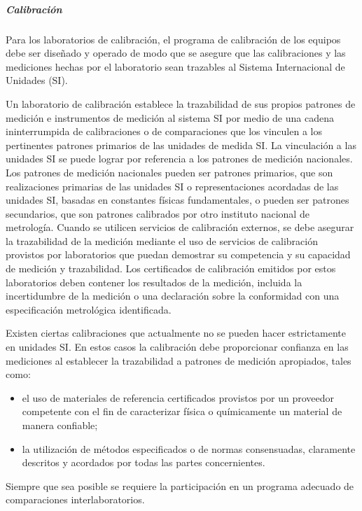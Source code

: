 \subparagraph{Calibración}
\par 
Para los laboratorios de calibración, el programa de calibración de los equipos debe ser diseñado
y operado de modo que se asegure que las calibraciones y las mediciones hechas por el laboratorio sean
trazables al Sistema Internacional de Unidades (SI).
\par \noindent
Un laboratorio de calibración establece la trazabilidad de sus propios patrones de medición e instrumentos de
medición al sistema SI por medio de una cadena ininterrumpida de calibraciones o de comparaciones que los
vinculen a los pertinentes patrones primarios de las unidades de medida SI. La vinculación a las unidades SI se
puede lograr por referencia a los patrones de medición nacionales. Los patrones de medición nacionales
pueden ser patrones primarios, que son realizaciones primarias de las unidades SI o representaciones
acordadas de las unidades SI, basadas en constantes físicas fundamentales, o pueden ser patrones
secundarios, que son patrones calibrados por otro instituto nacional de metrología. Cuando se utilicen servicios
de calibración externos, se debe asegurar la trazabilidad de la medición mediante el uso de servicios de
calibración provistos por laboratorios que puedan demostrar su competencia y su capacidad de medición y
trazabilidad. Los certificados de calibración emitidos por estos laboratorios deben contener los resultados de la
medición, incluida la incertidumbre de la medición o una declaración sobre la conformidad con una
especificación metrológica identificada.

\par \noindent
Existen ciertas calibraciones que actualmente no se pueden hacer estrictamente en unidades SI.
En estos casos la calibración debe proporcionar confianza en las mediciones al establecer la trazabilidad a
patrones de medición apropiados, tales como:

\begin{itemize}
	\item el uso de materiales de referencia certificados provistos por un proveedor competente con el fin de
	caracterizar física o químicamente un material de manera confiable;
	
	\item la utilización de métodos especificados o de normas consensuadas, claramente descritos y acordados
	por todas las partes concernientes.
\end{itemize}

\par \noindent
Siempre que sea posible se requiere la participación en un programa adecuado de comparaciones
interlaboratorios.

